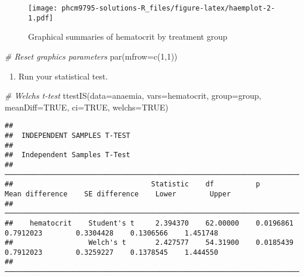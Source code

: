 \documentclass[
]{memoir}
\newenvironment{Shaded}{\begin{snugshade}}{\end{snugshade}}
\newcommand{\AttributeTok}[1]{\textcolor[rgb]{0.77,0.63,0.00}{#1}}
\newcommand{\CommentTok}[1]{\textcolor[rgb]{0.56,0.35,0.01}{\textit{#1}}}
\newcommand{\ConstantTok}[1]{\textcolor[rgb]{0.00,0.00,0.00}{#1}}
\newcommand{\DecValTok}[1]{\textcolor[rgb]{0.00,0.00,0.81}{#1}}
\newcommand{\FunctionTok}[1]{\textcolor[rgb]{0.00,0.00,0.00}{#1}}
\newcommand{\NormalTok}[1]{#1}
\providecommand{\tightlist}{%
  \setlength{\itemsep}{0pt}\setlength{\parskip}{0pt}}
\begin{document}
\begin{figure}
\centering
\texttt{[image: phcm9795-solutions-R\_files/figure-latex/haemplot-2-1.pdf]}
\caption{\label{fig:haemplot-2}Graphical summaries of hematocrit by treatment group}
\end{figure}

\begin{Shaded}
\begin{Highlighting}[]
\CommentTok{\# Reset graphics parameters}
\FunctionTok{par}\NormalTok{(}\AttributeTok{mfrow=}\FunctionTok{c}\NormalTok{(}\DecValTok{1}\NormalTok{,}\DecValTok{1}\NormalTok{))}
\end{Highlighting}
\end{Shaded}

\begin{enumerate}
\def\labelenumi{\alph{enumi})}
\setcounter{enumi}{2}
\tightlist
\item
  Run your statistical test.
\end{enumerate}

\begin{Shaded}
\begin{Highlighting}[]
\CommentTok{\# Welch\textquotesingle{}s t{-}test}
\FunctionTok{ttestIS}\NormalTok{(}\AttributeTok{data=}\NormalTok{anaemia, }\AttributeTok{vars=}\NormalTok{hematocrit, }\AttributeTok{group=}\NormalTok{group, }\AttributeTok{meanDiff=}\ConstantTok{TRUE}\NormalTok{, }\AttributeTok{ci=}\ConstantTok{TRUE}\NormalTok{, }\AttributeTok{welchs=}\ConstantTok{TRUE}\NormalTok{)}
\end{Highlighting}
\end{Shaded}

\begin{verbatim}
## 
##  INDEPENDENT SAMPLES T-TEST
## 
##  Independent Samples T-Test                                                                                                       
##  ──────────────────────────────────────────────────────────────────────────────────────────────────────────────────────────────── 
##                                 Statistic    df          p            Mean difference    SE difference    Lower        Upper      
##  ──────────────────────────────────────────────────────────────────────────────────────────────────────────────────────────────── 
##    hematocrit    Student's t     2.394370    62.00000    0.0196861          0.7912023        0.3304428    0.1306566    1.451748   
##                  Welch's t       2.427577    54.31900    0.0185439          0.7912023        0.3259227    0.1378545    1.444550   
##  ────────────────────────────────────────────────────────────────────────────────────────────────────────────────────────────────
\end{verbatim}
\end{document}
